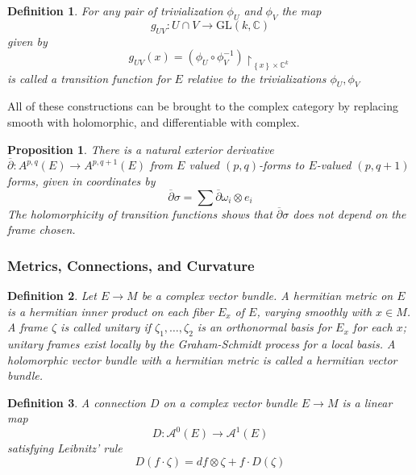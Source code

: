 \documentclass{article}
\newtheorem{defn}{Definition}
\newtheorem{prop}{Proposition}
\begin{document}
\begin{defn}
	For any pair of trivialization $ \phi_U$ and $ \phi_V$ the map
	\[
		g_{UV}: U \cap V \to \mathrm{GL}(k, \mathbb{C})
	\]
	given by 
	\[
		g_{UV}(x) = \left( \phi_U \circ \phi_V^{-1} \right) \restriction_{ \left\{ x \right\} \times \mathbb{C}^k }
	\]
	is called a \textit{transition function} for $E$ relative to the trivializations $ \phi_U, \phi_V$
\end{defn}

All of these constructions can be brought to the complex category by replacing smooth with holomorphic, and differentiable with complex.

\begin{prop}
	There is a natural exterior derivative $ \overline{\partial}: A^{p,q}(E) \to A^{p,q+1}(E)$ from $E$ valued $(p,q)$-forms to $E$-valued $(p, q+1)$ forms, given in coordinates by 
	\[
	\overline{\partial} \sigma = \sum \overline{\partial}\omega_i \otimes e_i
	\]
	The holomorphicity of transition functions shows that $ \overline{\partial}\sigma$ does not depend on the frame chosen.	
\end{prop}

\subsubsection{Metrics, Connections, and Curvature}
\begin{defn}


Let $ E \to M$ be a complex vector bundle. A \textit{hermitian metric} on $E$ is a hermitian inner product on each fiber $E_x$ of $E$, varying smoothly with $ x \in M$. A frame $\zeta$ is called \textit{unitary} if $ \zeta_1, \ldots, \zeta_2$ is an orthonormal basis for $E_x$ for each $x$; unitary frames exist locally by the Graham-Schmidt process for a local basis. A holomorphic vector bundle with a hermitian metric is called a \textit{hermitian vector bundle}.

\end{defn}

\begin{defn}

A \textit{connection} $D$ on a complex vector bundle $E \to M$ is a linear map
\[
	D: \mathcal{A}^0 (E) \to \mathcal{A}^1(E)
\]
satisfying Leibnitz' rule
\[
	D(f \cdot \zeta) = df \otimes \zeta + f \cdot D( \zeta )
\]


\end{defn}
\end{document}
